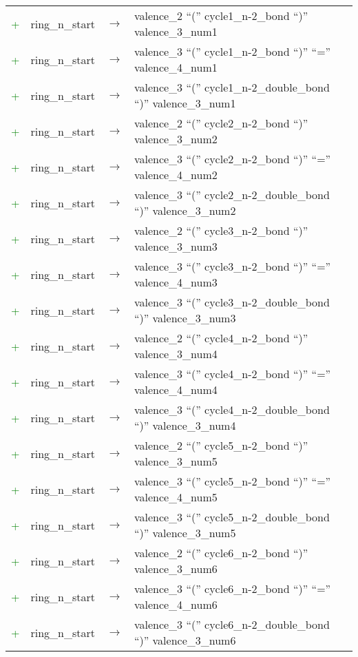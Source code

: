 \begin{longtable}{m{} m{} p{} p{}}
    \textcolor{green}{+} & ring\_n\_start & $\rightarrow$ & valence\_2 ``('' cycle1\_n-2\_bond ``)'' valence\_3\_num1 \\
    \textcolor{green}{+} & ring\_n\_start & $\rightarrow$ & valence\_3 ``('' cycle1\_n-2\_bond ``)'' ``='' valence\_4\_num1 \\
    \textcolor{green}{+} & ring\_n\_start & $\rightarrow$ & valence\_3 ``('' cycle1\_n-2\_double\_bond ``)'' valence\_3\_num1 \\
    \textcolor{green}{+} & ring\_n\_start & $\rightarrow$ & valence\_2 ``('' cycle2\_n-2\_bond ``)'' valence\_3\_num2 \\
    \textcolor{green}{+} & ring\_n\_start & $\rightarrow$ & valence\_3 ``('' cycle2\_n-2\_bond ``)'' ``='' valence\_4\_num2 \\
    \textcolor{green}{+} & ring\_n\_start & $\rightarrow$ & valence\_3 ``('' cycle2\_n-2\_double\_bond ``)'' valence\_3\_num2 \\
    \textcolor{green}{+} & ring\_n\_start & $\rightarrow$ & valence\_2 ``('' cycle3\_n-2\_bond ``)'' valence\_3\_num3 \\
    \textcolor{green}{+} & ring\_n\_start & $\rightarrow$ & valence\_3 ``('' cycle3\_n-2\_bond ``)'' ``='' valence\_4\_num3 \\
    \textcolor{green}{+} & ring\_n\_start & $\rightarrow$ & valence\_3 ``('' cycle3\_n-2\_double\_bond ``)'' valence\_3\_num3 \\
    \textcolor{green}{+} & ring\_n\_start & $\rightarrow$ & valence\_2 ``('' cycle4\_n-2\_bond ``)'' valence\_3\_num4 \\
    \textcolor{green}{+} & ring\_n\_start & $\rightarrow$ & valence\_3 ``('' cycle4\_n-2\_bond ``)'' ``='' valence\_4\_num4 \\
    \textcolor{green}{+} & ring\_n\_start & $\rightarrow$ & valence\_3 ``('' cycle4\_n-2\_double\_bond ``)'' valence\_3\_num4 \\
    \textcolor{green}{+} & ring\_n\_start & $\rightarrow$ & valence\_2 ``('' cycle5\_n-2\_bond ``)'' valence\_3\_num5 \\
    \textcolor{green}{+} & ring\_n\_start & $\rightarrow$ & valence\_3 ``('' cycle5\_n-2\_bond ``)'' ``='' valence\_4\_num5 \\
    \textcolor{green}{+} & ring\_n\_start & $\rightarrow$ & valence\_3 ``('' cycle5\_n-2\_double\_bond ``)'' valence\_3\_num5 \\
    \textcolor{green}{+} & ring\_n\_start & $\rightarrow$ & valence\_2 ``('' cycle6\_n-2\_bond ``)'' valence\_3\_num6 \\
    \textcolor{green}{+} & ring\_n\_start & $\rightarrow$ & valence\_3 ``('' cycle6\_n-2\_bond ``)'' ``='' valence\_4\_num6 \\
    \textcolor{green}{+} & ring\_n\_start & $\rightarrow$ & valence\_3 ``('' cycle6\_n-2\_double\_bond ``)'' valence\_3\_num6 \\
\end{longtable}
\normalsize

